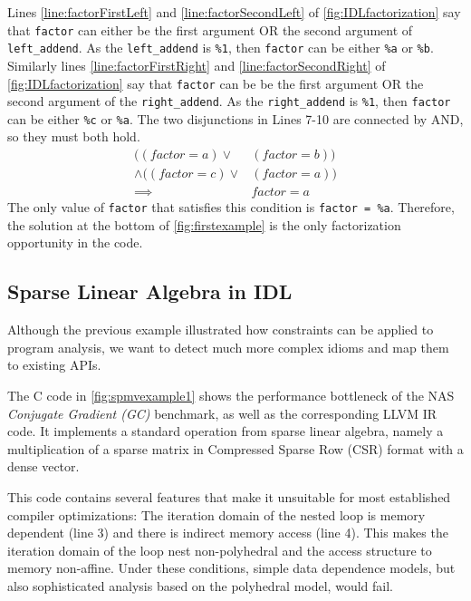 Lines \autoref{line:factorFirstLeft} and \autoref{line:factorSecondLeft} of \autoref{fig:IDLfactorization} say that {\tt factor} can either be the first argument OR the second argument of {\tt left\_addend}.
As the {\tt left\_addend} is {\tt \%1}, then {\tt factor} can be either {\tt \%a} or {\tt \%b}.
Similarly lines \autoref{line:factorFirstRight} and \autoref{line:factorSecondRight} of \autoref{fig:IDLfactorization} say that {\tt factor} can be be the first argument OR the second argument of the {\tt right\_addend}.
As the {\tt right\_addend} is {\tt \%1}, then {\tt factor} can be either {\tt \%c} or {\tt \%a}.
The two disjunctions in Lines 7-10 are connected by AND, so they must both hold.
\begin{equation}
\begin{split}
((factor = a) \lor & (factor = b)) \\\land ((factor = c) \lor & (factor = a)) \\
\implies & factor = a 
\end{split}
\nonumber
\end{equation}
The only value of {\tt factor} that satisfies this condition is {\tt factor = \%a}.
Therefore, the solution at the bottom of \autoref{fig:firstexample} is the only factorization opportunity in the code.

\begin{figure}[p]
    
\end{figure}

\subsection{Sparse Linear Algebra in IDL}

    Although the previous example illustrated how constraints can be applied to 
    program analysis, we want to detect much more complex idioms and 
    map them to existing APIs.

    The C code in \autoref{fig:spmvexample1} shows the performance bottleneck of
    the NAS \emph{Conjugate Gradient (GC)} benchmark, as well as the
    corresponding LLVM IR code.
    It implements a standard operation from sparse linear algebra, namely a
    multiplication of a sparse matrix in Compressed Sparse Row (CSR) format with
    a dense vector.

    This code contains several features that make it unsuitable for most
    established compiler optimizations:
    The iteration domain of the nested loop is memory dependent (line 3) and
    there is indirect memory access (line 4).
    This makes the iteration domain of the loop nest non-polyhedral and the
    access structure to memory non-affine.
    Under these conditions, simple data dependence models, but also
    sophisticated analysis based on the polyhedral model, would fail.

